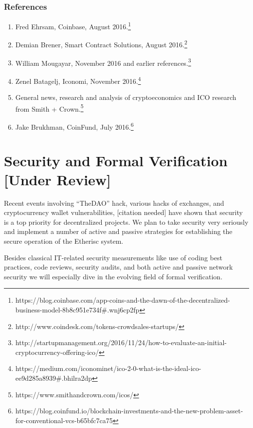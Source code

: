 \documentclass[12pt]{article}
\begin{document}
\subsubsection{References}

\begin{enumerate}
    \item Fred Ehrsam, Coinbase, August 2016.\footnote{https://blog.coinbase.com/app-coins-and-the-dawn-of-the-decentralized-business-model-8b8c951e734f#.wnj6cp2fp}

    \item Demian Brener, Smart Contract Solutions, August 2016.\footnote{http://www.coindesk.com/tokens-crowdsales-startups/}

    \item William Mougayar, November 2016 and earlier references.\footnote{http://startupmanagement.org/2016/11/24/how-to-evaluate-an-initial-cryptocurrency-offering-ico/}
    
    \item Zenel Batagelj, Iconomi, November 2016.\footnote{https://medium.com/iconominet/ico-2-0-what-is-the-ideal-ico-ee9d285a8939#.bhilra2dp}

    \item General news, research and analysis of cryptoeconomics and ICO research from Smith + Crown.\footnote{https://www.smithandcrown.com/icos/}

    \item Jake Brukhman, CoinFund, July 2016.\footnote{https://blog.coinfund.io/blockchain-investments-and-the-new-problem-asset-for-conventional-vcs-b65bfc7ca75}
\end{enumerate}


\section{Security and Formal Verification [Under Review]}

Recent events involving “TheDAO” hack, various hacks of exchanges, and cryptocurrency wallet vulnerabilities, [citation needed] have shown that security is a top priority for decentralized projects. We plan to take security very seriously and implement a number of active and passive strategies for establishing the secure operation of the Etherisc system.

Besides classical IT-related security measurements like use of coding best practices, code reviews, security audits, and both active and passive network security we will especially dive in the evolving field of formal verification.
\end{document}
